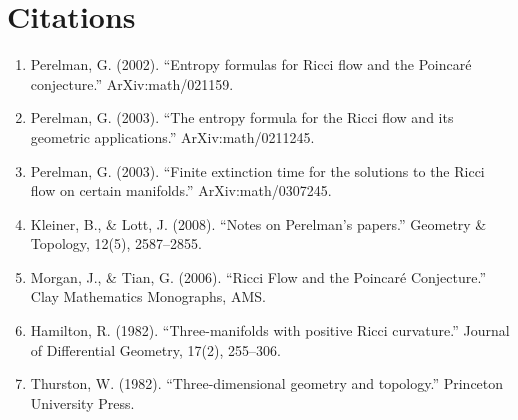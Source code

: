 \section{Citations}

\begin{enumerate}
\item Perelman, G. (2002). ``Entropy formulas for Ricci flow and the Poincar\'e conjecture.'' ArXiv:math/021159.
\item Perelman, G. (2003). ``The entropy formula for the Ricci flow and its geometric applications.'' ArXiv:math/0211245.
\item Perelman, G. (2003). ``Finite extinction time for the solutions to the Ricci flow on certain manifolds.'' ArXiv:math/0307245.
\item Kleiner, B., \& Lott, J. (2008). ``Notes on Perelman's papers.'' Geometry \& Topology, 12(5), 2587--2855.
\item Morgan, J., \& Tian, G. (2006). ``Ricci Flow and the Poincar\'e Conjecture.'' Clay Mathematics Monographs, AMS.
\item Hamilton, R. (1982). ``Three-manifolds with positive Ricci curvature.'' Journal of Differential Geometry, 17(2), 255--306.
\item Thurston, W. (1982). ``Three-dimensional geometry and topology.'' Princeton University Press.
\end{enumerate}